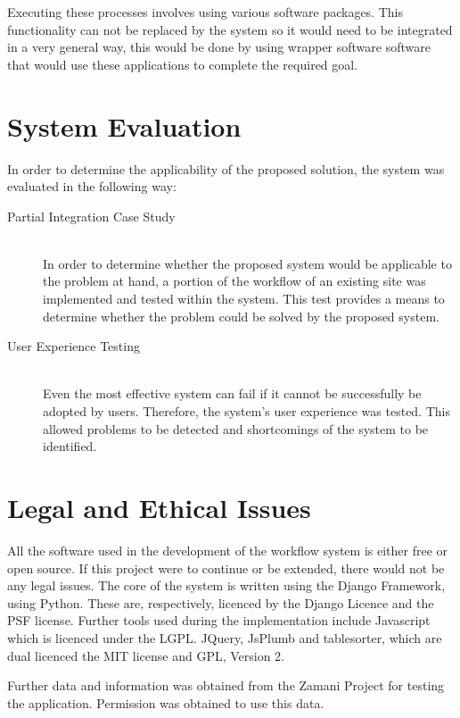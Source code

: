     Executing these processes involves using various software packages.
    This functionality can not be replaced by the system so it would need
    to be integrated in a very general way, this would be done by using wrapper
    software software that would use these applications to complete the required goal.

\section{System Evaluation}
    In order to determine the applicability of the proposed solution, the system
    was evaluated in the following way:

    \begin{description}
        \item[Partial Integration Case Study]\hfill \\
            In order to determine whether the proposed system
            would be applicable to the problem at hand, a portion of the workflow
            of an existing site was implemented and tested within the system. This
            test provides a means to determine whether the problem could be solved
            by the proposed system.
        \item[User Experience Testing] \hfill \\
            Even the most effective system can fail if it cannot
            be successfully be adopted by users. Therefore, the system's
            user experience was tested. This allowed problems to be detected and
            shortcomings of the system to be identified\cite{tullis2008measuring}.
    \end{description}

\section{Legal and Ethical Issues}
    All the software used in the development of the workflow system
    is either free or open source. If this project were to continue
    or be extended, there would not be any legal issues. The core
    of the system is written using the Django Framework, using Python.
    These are, respectively, licenced by the Django Licence and the PSF
    license. Further tools used during the implementation include Javascript
    which is licenced under the LGPL.
    JQuery, JsPlumb and tablesorter, which are dual licenced the  MIT license 
    and GPL, Version 2.

    Further data and information was obtained from the Zamani Project for
    testing the application. Permission was obtained to use this data.

